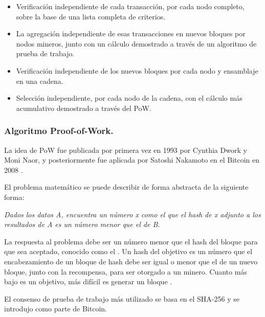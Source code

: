 \begin{itemize}
    \item Verificación independiente de cada transacción, por cada nodo completo, sobre la base de una lista completa 
    de criterios.
    \item La agregación independiente de esas transacciones en nuevos bloques por nodos mineros, junto con un cálculo 
    demostrado a través de un algoritmo de prueba de trabajo.
    \item Verificación independiente de los nuevos bloques por cada nodo y ensamblaje en una cadena.
    \item Selección independiente, por cada nodo de la cadena, con el cálculo más acumulativo demostrado a través del 
    PoW.
\end{itemize}

\subsubsection*{Algoritmo Proof-of-Work.}

La idea de PoW fue publicada por primera vez en 1993 por Cynthia Dwork y Moni Naor, y posteriormente fue 
aplicada por Satoshi Nakamoto en el Bitcoin en 2008 \cite{proof-of-work}. 

\vspace{5mm}

\noindent El problema matemático se puede describir de forma abstracta de la siguiente forma: 

\vspace{5mm}

\noindent \textit{Dados los datos A, encuentra un número x como el que el hash de x adjunto a los resultados de A es un 
número menor que el de B.}

\vspace{5mm}

\noindent La respuesta al problema debe ser un número menor que el hash del bloque para que sea aceptado, conocido como 
el . Un hash del objetivo es un número que el encabezamiento de un bloque de hash debe ser igual 
o menor que el de un nuevo bloque, junto con la recompensa, para ser otorgado a un minero. Cuanto más bajo es un 
objetivo, más difícil es generar un bloque \cite{proof-of-work}.

\vspace{5mm}

\noindent El consenso de prueba de trabajo más utilizado se basa en el SHA-256 y se introdujo como parte de Bitcoin.


